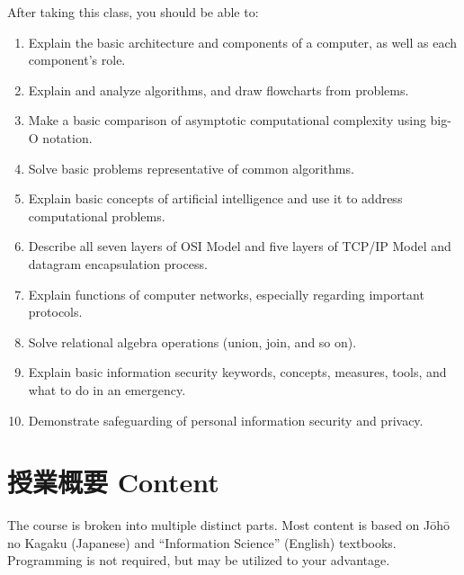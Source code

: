 \documentclass[a4paper]{article}
\begin{document}
After taking this class, you should be able to:
\begin{enumerate}
    \item Explain the basic architecture and components of a computer, as well as each component's role.
   	\item Explain and analyze algorithms, and draw flowcharts from problems.
   	\item Make a basic comparison of asymptotic computational complexity using big-O notation.
   	\item Solve basic problems representative of common algorithms.
   	\item Explain basic concepts of artificial intelligence and use it to address computational problems.
   	\item Describe all seven layers of OSI Model and five layers of TCP/IP Model and datagram encapsulation process.
   	\item Explain functions of computer networks, especially regarding important protocols.
   	\item Solve relational algebra operations (union, join, and so on).
   	\item Explain basic information security keywords, concepts, measures, tools, and what to do in an emergency.
   	\item Demonstrate safeguarding of personal information security and privacy.
\end{enumerate}

\section{授業概要 Content}
The course is broken into multiple distinct parts. Most content is based on J\={o}h\={o} no Kagaku (Japanese) and ``Information Science'' (English) textbooks. Programming is not required, but may be utilized to your advantage.
\end{document}
